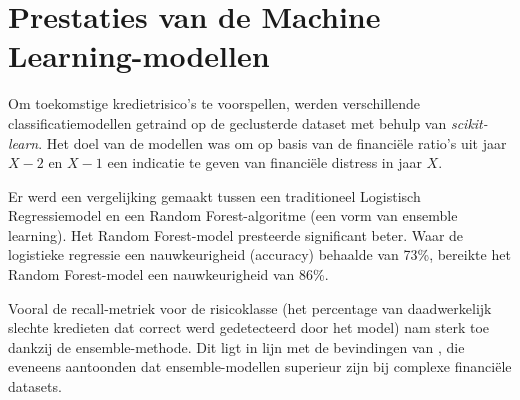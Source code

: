 \begin{table}[htbp]
    \small
    \caption{XGBoost model metrics na k-means clustering}
    \label{tab:model_merics_k_means}
    
\end{table}

\section{Prestaties van de Machine Learning-modellen}
Om toekomstige kredietrisico's te voorspellen, werden verschillende classificatiemodellen getraind op de geclusterde dataset met behulp van \textit{scikit-learn}. Het doel van de modellen was om op basis van de financiële ratio's uit jaar $X-2$ en $X-1$ een indicatie te geven van financiële distress in jaar $X$.

Er werd een vergelijking gemaakt tussen een traditioneel Logistisch Regressiemodel en een Random Forest-algoritme (een vorm van ensemble learning). Het Random Forest-model presteerde significant beter. Waar de logistieke regressie een nauwkeurigheid (accuracy) behaalde van 73\%, bereikte het Random Forest-model een nauwkeurigheid van 86\%.

Vooral de recall-metriek voor de risicoklasse (het percentage van daadwerkelijk slechte kredieten dat correct werd gedetecteerd door het model) nam sterk toe dankzij de ensemble-methode. Dit ligt in lijn met de bevindingen van \textcite{Moscato2021}, die eveneens aantoonden dat ensemble-modellen superieur zijn bij complexe financiële datasets.